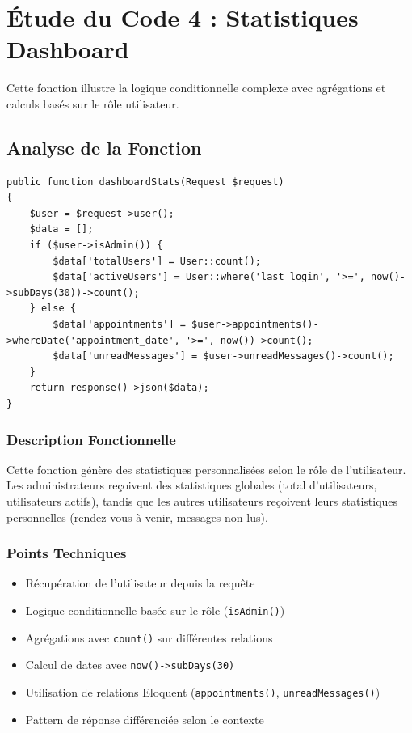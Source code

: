 \documentclass[12pt,a4paper]{report}
\begin{document}
\newpage
\section{Étude du Code 4 : Statistiques Dashboard}

Cette fonction illustre la logique conditionnelle complexe avec agrégations et calculs basés sur le rôle utilisateur.

\subsection{Analyse de la Fonction}

\begin{lstlisting}[style=phpstyle, caption=Fonction dashboardStats]
public function dashboardStats(Request $request)
{
    $user = $request->user();
    $data = [];
    if ($user->isAdmin()) {
        $data['totalUsers'] = User::count();
        $data['activeUsers'] = User::where('last_login', '>=', now()->subDays(30))->count();
    } else {
        $data['appointments'] = $user->appointments()->whereDate('appointment_date', '>=', now())->count();
        $data['unreadMessages'] = $user->unreadMessages()->count();
    }
    return response()->json($data);
}
\end{lstlisting}

\subsubsection{Description Fonctionnelle}

Cette fonction génère des statistiques personnalisées selon le rôle de l'utilisateur. Les administrateurs reçoivent des statistiques globales (total d'utilisateurs, utilisateurs actifs), tandis que les autres utilisateurs reçoivent leurs statistiques personnelles (rendez-vous à venir, messages non lus).

\subsubsection{Points Techniques}

\begin{itemize}
    \item Récupération de l'utilisateur depuis la requête
    \item Logique conditionnelle basée sur le rôle (\texttt{isAdmin()})
    \item Agrégations avec \texttt{count()} sur différentes relations
    \item Calcul de dates avec \texttt{now()->subDays(30)}
    \item Utilisation de relations Eloquent (\texttt{appointments()}, \texttt{unreadMessages()})
    \item Pattern de réponse différenciée selon le contexte
\end{itemize}
\end{document}
